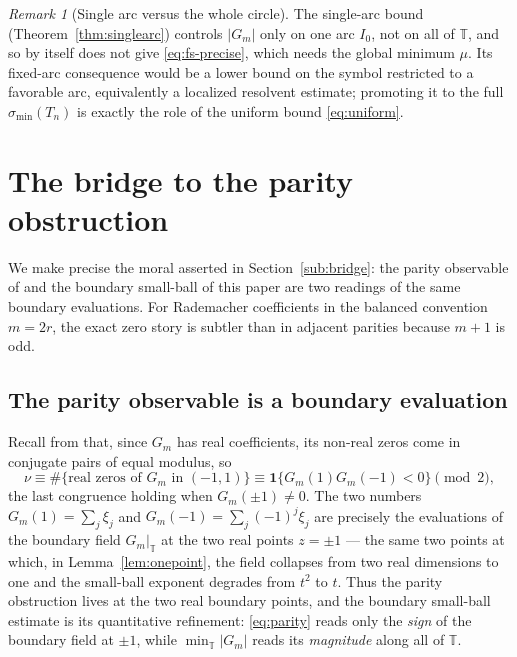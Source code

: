 \documentclass[11pt]{amsart}
\numberwithin{equation}{section}
\theoremstyle{definition}
\theoremstyle{remark}
\newtheorem{remark}[theorem]{Remark}
\newcommand{\T}{\mathbb T}
\newcommand{\smin}{\sigma_{\min}}
\newcommand{\abs}[1]{\left\lvert #1\right\rvert}
\begin{document}
\begin{remark}[Single arc versus the whole circle]\label{rem:onesided}
The single-arc bound (Theorem~\ref{thm:singlearc}) controls \(\abs{G_m}\) only on one arc \(I_0\), not on all of \(\T\), and so by itself does not give \eqref{eq:fs-precise}, which needs the global minimum \(\mu\). Its fixed-arc consequence would be a lower bound on the symbol restricted to a favorable arc, equivalently a localized resolvent estimate; promoting it to the full \(\smin(T_n)\) is exactly the role of the uniform bound \eqref{eq:uniform}.
\end{remark}

\section{The bridge to the parity obstruction}\label{sec:bridge}

We make precise the moral asserted in Section~\ref{sub:bridge}: the parity observable of \cite{Parity} and the boundary small-ball of this paper are two readings of the same boundary evaluations. For Rademacher coefficients in the balanced convention \(m=2r\), the exact zero story is subtler than in adjacent parities because \(m+1\) is odd.

\subsection{The parity observable is a boundary evaluation}
Recall from \cite[Lem.~2.1]{Parity} that, since $G_m$ has real coefficients, its non-real zeros come in conjugate pairs of equal modulus, so
\begin{equation}\label{eq:parity}
  \nu\equiv\#\{\text{real zeros of }G_m\text{ in }(-1,1)\}\equiv\mathbf1\{G_m(1)G_m(-1)<0\}\pmod2,
\end{equation}
the last congruence holding when $G_m(\pm1)\ne0$. The two numbers $G_m(1)=\sum_j\xi_j$ and $G_m(-1)=\sum_j(-1)^j\xi_j$ are precisely the evaluations of the boundary field $G_m|_\T$ at the two real points $z=\pm1$ --- the same two points at which, in Lemma~\ref{lem:onepoint}, the field collapses from two real dimensions to one and the small-ball exponent degrades from $t^2$ to $t$. Thus the parity obstruction lives at the two real boundary points, and the boundary small-ball estimate is its quantitative refinement: \eqref{eq:parity} reads only the \emph{sign} of the boundary field at $\pm1$, while $\min_\T\abs{G_m}$ reads its \emph{magnitude} along all of $\T$.
\end{document}
